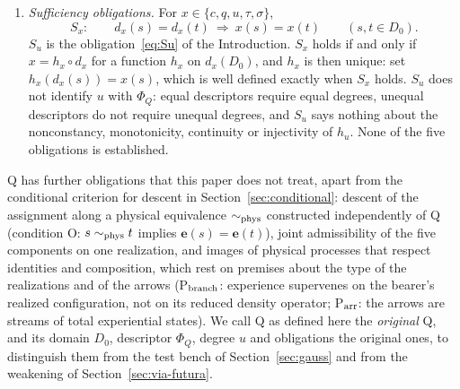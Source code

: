 \begin{definition}
\begin{enumerate}
\item[(e)] \emph{Sufficiency obligations.} For $x\in\{c,q,u,\tau,\sigma\}$,
\[
S_x:\qquad d_x(s)=d_x(t)\ \Longrightarrow\ x(s)=x(t)\qquad(s,t\in D_0).
\]
$S_u$ is the obligation~\eqref{eq:Su} of the Introduction. $S_x$ holds if and only if $x=h_x\circ d_x$ for a function $h_x$ on $d_x(D_0)$, and $h_x$ is then unique: set $h_x(d_x(s))=x(s)$, which is well defined exactly when $S_x$ holds. $S_u$ does not identify $u$ with $\Phi_Q$: equal descriptors require equal degrees, unequal descriptors do not require unequal degrees, and $S_u$ says nothing about the nonconstancy, monotonicity, continuity or injectivity of $h_u$. None of the five obligations is established.
\end{enumerate}
Q has further obligations that this paper does not treat, apart from the conditional criterion for descent in Section~\ref{sec:conditional}: descent of the assignment along a physical equivalence $\sim_{\rm phys}$ constructed independently of Q (condition O: $s\sim_{\rm phys}t$ implies $\mathbf e(s)=\mathbf e(t)$), joint admissibility of the five components on one realization, and images of physical processes that respect identities and composition, which rest on premises about the type of the realizations and of the arrows (P$_{\rm branch}$: experience supervenes on the bearer's realized configuration, not on its reduced density operator; P$_{\rm arr}$: the arrows are streams of total experiential states).
We call Q as defined here the \emph{original} Q, and its domain $D_0$, descriptor $\Phi_Q$, degree $u$ and obligations the original ones, to distinguish them from the test bench of Section~\ref{sec:gauss} and from the weakening of Section~\ref{sec:via-futura}.
\end{definition}

